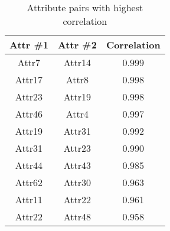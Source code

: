 \begin{table}[H]
\centering
\begin{tabular}{cc|c}
     \textbf{Attr \#1}&\textbf{Attr \#2} &\textbf{Correlation} \\ \hline
     Attr7 & Attr14 & 0.999 \\
     Attr17 & Attr8 & 0.998 \\
     Attr23 & Attr19 & 0.998 \\
     Attr46 & Attr4 & 0.997 \\
     Attr19 & Attr31 & 0.992 \\
     Attr31 & Attr23 & 0.990 \\
     Attr44 & Attr43 & 0.985 \\
     Attr62 & Attr30 & 0.963 \\
     Attr11 & Attr22 & 0.961 \\
     Attr22 & Attr48 & 0.958 \\
    
\end{tabular}
\caption{\label{tab::highest_correlation} Attribute pairs with highest correlation}
\end{table}